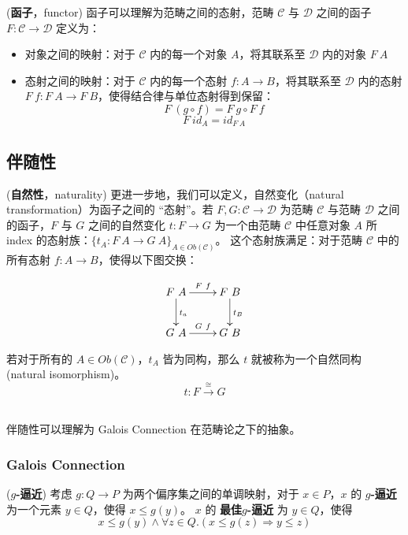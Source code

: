 \begin{defn} (\textbf{函子}，functor)
函子可以理解为范畴之间的态射，范畴 $\mathcal{C}$ 与 $\mathcal{D}$ 之间的函子 $F : \mathcal{C} \rightarrow \mathcal{D}$ 定义为：
\begin{itemize}
    \item 对象之间的映射：对于 $\mathcal{C}$ 内的每一个对象 $A$，将其联系至 $\mathcal{D}$ 内的对象 $F\ A$
    \item 态射之间的映射：对于 $\mathcal{C}$ 内的每一个态射 $f : A \rightarrow B$，将其联系至 $\mathcal{D}$ 内的态射 $F\ f : F\ A \rightarrow F\ B$，使得结合律与单位态射得到保留：
    \[ F\ (g \circ f) = F\ g \circ F\ f\]
    \[ F\ id_{A} = id_{F\ A}\]
\end{itemize}
\end{defn}


\subsection{伴随性}

\begin{defn} (\textbf{自然性}，naturality)
更进一步地，我们可以定义，自然变化（natural transformation）为函子之间的 ``态射''。若 $F, G : \mathcal{C} \rightarrow \mathcal{D}$ 为范畴 $\mathcal{C}$ 与范畴 $\mathcal{D}$ 之间的函子，$F$ 与 $G$ 之间的自然变化 $t : F \rightarrow G$ 为一个由范畴 $\mathcal{C}$ 中任意对象 $A$ 所 index 的态射族：${\{t_A : F\ A \rightarrow G\ A\}}_{A\in Ob(\mathcal{C})}$。 这个态射族满足：对于范畴 $\mathcal{C}$ 中的所有态射 $f : A \rightarrow B$，使得以下图交换：

\[\xymatrix{
F\ A  \ar[d]^{t_a}  \ar[r]^{F\ f} & F\ B \ar[d]^{t_B}\\
G\ A  \ar[r]^{G\ f} & G\ B
}\]

若对于所有的 $A \in Ob(\mathcal{C})$，$t_A$ 皆为同构，那么 $t$ 就被称为一个自然同构 (natural isomorphism)。
\[ t : F \overset{\cong}\longrightarrow G \]\\

\end{defn}

伴随性可以理解为 Galois Connection 在范畴论之下的抽象。\\

\subsubsection{Galois Connection}

\begin{defn} (\textbf{$g$-逼近})
考虑 $g : Q \rightarrow P$ 为两个偏序集之间的单调映射，对于 $x \in P$，$x$ 的 \textbf{$g$-逼近} 为一个元素 $y \in Q$，使得 $x \le g(y)$。
$x$ 的 \textbf{最佳$g$-逼近} 为 $y \in Q$，使得
\[ x \le g(y) \wedge \forall z \in Q . (x \le g(z) \Rightarrow y \le z) \]
\end{defn}

